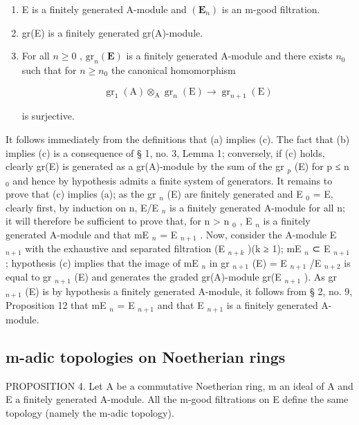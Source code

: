 \begin{enumerate}
\def\labelenumi{(\alph{enumi})}
\item
  E is a finitely generated A-module and \((\mathbf{E}_{n})\) is an m-good filtration.
\item
  gr(E) is a finitely generated gr(A)-module.
\item
  For all \(n \geqslant 0\) , \(\mathrm{gr}_n(\mathbf{E})\) is a finitely generated A-module and there exists \(n_0\) such that for \(n \geqslant n_0\) the canonical homomorphism

\[
\operatorname{gr} _ {1} (\mathrm{A}) \otimes_ {\mathrm{A}} \operatorname{gr} _ {n} (\mathrm{E}) \rightarrow \operatorname{gr} _ {n + 1} (\mathrm{E})\tag{3}
\]

is surjective.
\end{enumerate}

It follows immediately from the definitions that (a) implies (c). The fact that (b) implies (c) is a consequence of § 1, no. 3, Lemma 1; conversely, if (c) holds, clearly gr(E) is generated as a gr(A)-module by the sum of the gr \(_{p}\) (E) for p ≤ n \(_{0}\) and hence by hypothesis admits a finite system of generators. It remains to prove that (c) implies (a); as the gr \(_{n}\) (E) are finitely generated and E \(_{0}\) = E, clearly first, by induction on n, E/E \(_{n}\) is a finitely generated A-module for all n; it will therefore be sufficient to prove that, for n \textgreater{} n \(_{0}\) , E \(_{n}\) is a finitely generated A-module and that mE \(_{n}\) = E \(_{n+1}\) . Now, consider the A-module E \(_{n+1}\) with the exhaustive and separated filtration (E \(_{n+k}\) )(k ≥ 1); mE \(_{n}\) ⊂ E \(_{n+1}\) ; hypothesis (c) implies that the image of mE \(_{n}\) in gr \(_{n+1}\) (E) = E \(_{n+1}\) /E \(_{n+2}\) is equal to gr \(_{n+1}\) (E) and generates the graded gr(A)-module gr(E \(_{n+1}\) ). As gr \(_{n+1}\) (E) is by hypothesis a finitely generated A-module, it follows from § 2, no. 9, Proposition 12 that mE \(_{n}\) = E \(_{n+1}\) and that E \(_{n+1}\) is a finitely generated A-module.

\subsection{m-adic topologies on Noetherian rings}

PROPOSITION 4. Let A be a commutative Noetherian ring, m an ideal of A and E a finitely generated A-module. All the m-good filtrations on E define the same topology (namely the m-adic topology).

